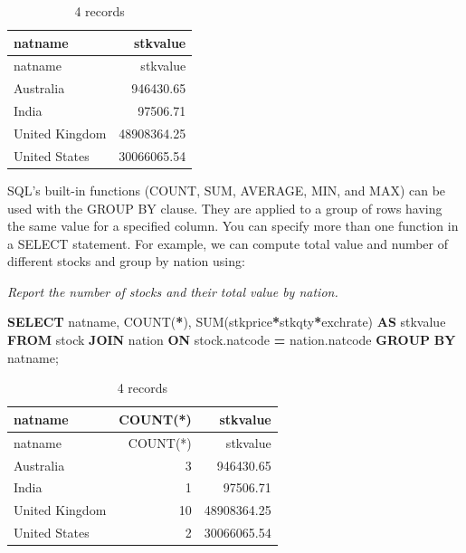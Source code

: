 \documentclass[
]{article}
\newenvironment{Shaded}{\begin{snugshade}}{\end{snugshade}}
\newcommand{\FunctionTok}[1]{\textcolor[rgb]{0.00,0.00,0.00}{#1}}
\newcommand{\KeywordTok}[1]{\textcolor[rgb]{0.13,0.29,0.53}{\textbf{#1}}}
\newcommand{\NormalTok}[1]{#1}
\newcommand{\OperatorTok}[1]{\textcolor[rgb]{0.81,0.36,0.00}{\textbf{#1}}}
\begin{document}
\begin{longtable}[]{@{}lr@{}}
\caption{4 records}\tabularnewline
\toprule()
natname & stkvalue \\
\midrule()
\endfirsthead
\toprule()
natname & stkvalue \\
\midrule()
\endhead
Australia & 946430.65 \\
India & 97506.71 \\
United Kingdom & 48908364.25 \\
United States & 30066065.54 \\
\bottomrule()
\end{longtable}

SQL's built-in functions (COUNT, SUM, AVERAGE, MIN, and MAX) can be used
with the GROUP BY clause. They are applied to a group of rows having the
same value for a specified column. You can specify more than one
function in a SELECT statement. For example, we can compute total value
and number of different stocks and group by nation using:

\emph{Report the number of stocks and their total value by nation.}

\begin{Shaded}
\begin{Highlighting}[]
\KeywordTok{SELECT}\NormalTok{ natname, }\FunctionTok{COUNT}\NormalTok{(}\OperatorTok{*}\NormalTok{), }\FunctionTok{SUM}\NormalTok{(stkprice}\OperatorTok{*}\NormalTok{stkqty}\OperatorTok{*}\NormalTok{exchrate) }\KeywordTok{AS}\NormalTok{ stkvalue}
    \KeywordTok{FROM}\NormalTok{ stock }\KeywordTok{JOIN}\NormalTok{ nation }\KeywordTok{ON}\NormalTok{ stock.natcode }\OperatorTok{=}\NormalTok{ nation.natcode}
        \KeywordTok{GROUP} \KeywordTok{BY}\NormalTok{ natname;}
\end{Highlighting}
\end{Shaded}

\begin{longtable}[]{@{}lrr@{}}
\caption{4 records}\tabularnewline
\toprule()
natname & COUNT(*) & stkvalue \\
\midrule()
\endfirsthead
\toprule()
natname & COUNT(*) & stkvalue \\
\midrule()
\endhead
Australia & 3 & 946430.65 \\
India & 1 & 97506.71 \\
United Kingdom & 10 & 48908364.25 \\
United States & 2 & 30066065.54 \\
\bottomrule()
\end{longtable}
\end{document}
